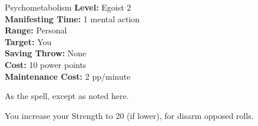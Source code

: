 {Psychometabolism}
{
	\textbf{Level:}
	Egoist 2\\
	\textbf{Manifesting Time:}
	1 mental action\\
	\textbf{Range:}
	Personal\\
	\textbf{Target:}
	You\\
	\textbf{Saving Throw:}
	None\\
	\textbf{Cost:}
	10 power points\\
	\textbf{Maintenance Cost:}
	2 pp/minute\\
}
{
	As the  spell, except as noted here.

	You increase your Strength to 20 (if lower), for disarm opposed rolls.
}